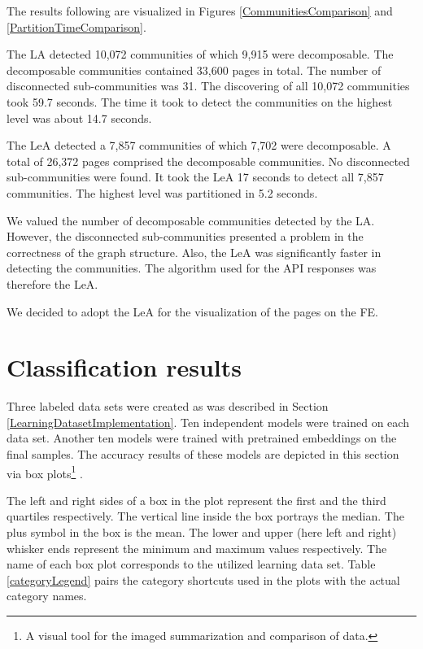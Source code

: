 The results following are visualized in Figures \ref{CommunitiesComparison} and \ref{PartitionTimeComparison}. 

The LA detected 10,072 communities of which 9,915 were decomposable. The decomposable communities contained 33,600 pages in total. The number of disconnected sub-communities was 31. The discovering of all 10,072 communities took 59.7 seconds. The time it took to detect the communities on the highest level was about 14.7 seconds. 

The LeA detected a 7,857 communities of which 7,702 were decomposable. A total of 26,372 pages comprised the decomposable communities. No disconnected sub-communities were found. It took the LeA 17 seconds to detect all 7,857 communities. The highest level was partitioned in 5.2 seconds. 

We valued the number of decomposable communities detected by the LA. However, the disconnected sub-communities presented a problem in the correctness of the graph structure. Also, the LeA was significantly faster in detecting the communities. The algorithm used for the API responses was therefore the LeA. 

We decided to adopt the LeA for the visualization of the pages on the FE. 

\section{Classification results}\label{classificationEvaluation}
Three labeled data sets were created as was described in Section \ref{LearningDatasetImplementation}. Ten independent models were trained on each data set. Another ten models were trained with pretrained embeddings on the final samples. The accuracy results of these models are depicted in this section via box plots\footnote{A visual tool for the imaged summarization and comparison of data.} \cite{boxplot}. 

The left and right sides of a box in the plot represent the first and the third quartiles respectively. The vertical line inside the box portrays the median. The plus symbol in the box is the mean. The lower and upper (here left and right) whisker ends represent the minimum and maximum values respectively. The name of each box plot corresponds to the utilized learning data set. Table \ref{categoryLegend} pairs the category shortcuts used in the plots with the actual category names. 

